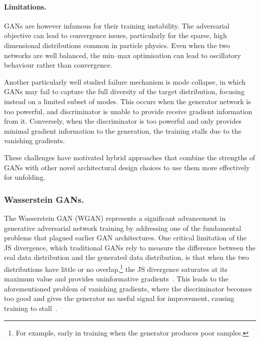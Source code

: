         \paragraph{Limitations.}
            GANs are however infamous for their training instability.
            The adversarial objective can lead to convergence issues, particularly for the sparse, high dimensional distributions common in particle physics.
            Even when the two networks are well balanced, the min--max optimisation can lead to oscillatory behaviour rather than convergence.
            
            Another particularly well studied failure mechanism is mode collapse, in which GANs may fail to capture the full diversity of the target distribution, focusing instead on a limited subset of modes.
            This occurs when the generator network is too powerful, and discriminator is unable to provide receive gradient information from it.
            Conversely, when the discriminator is too powerful and only provides minimal gradient information to the generation, the training stalls due to the vanishing gradients.
            
            These challenges have motivated hybrid approaches that combine the strengths of GANs with other novel architectural design choices to use them more effectively for unfolding.

    \subsubsection{Wasserstein GANs.}
        The Wasserstein GAN (WGAN) represents a significant advancement in generative adversarial network training by addressing one of the fundamental problems that plagued earlier GAN architectures.
        One critical limitation of the JS divergence, which traditional GANs rely to measure the difference between the real data distribution and the generated data distribution, is that when the two distributions have little or no overlap,\footnote{For example, early in training when the generator produces poor samples.} the JS divergence saturates at its maximum value and provides uninformative gradients~\cite{arjovsky_wasserstein_2017, gulrajani_improved_2017, arjovsky_towards_2017}.
        This leads to the aforementioned problem of vanishing gradients, where the discriminator becomes too good and gives the generator no useful signal for improvement, causing training to stall~\cite{goodfellow_nips_2017, salimans_improved_2016}.
        
